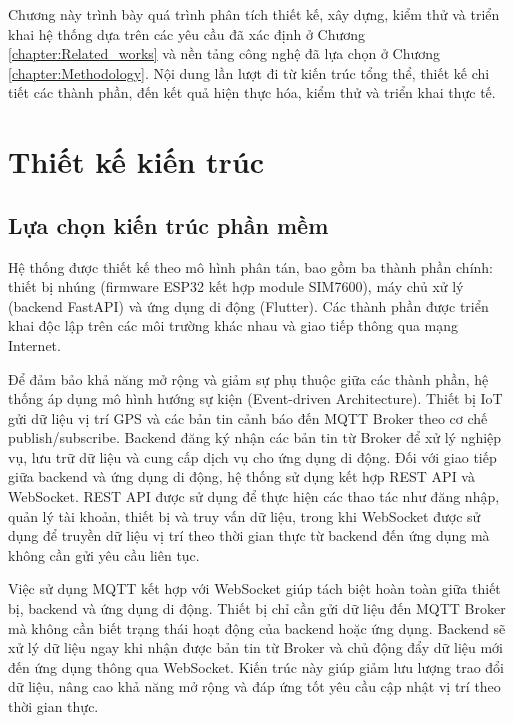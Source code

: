 \documentclass[../DoAn.tex]{subfiles}
\begin{document}
    \providecommand{\hinhcho}[1]{\fbox{\begin{minipage}[c][5.5cm][c]{0.85\textwidth}\centering\textit{[#1]}\end{minipage}}}

    Chương này trình bày quá trình phân tích thiết kế, xây dựng, kiểm thử và triển khai hệ thống dựa trên các yêu cầu đã xác định ở Chương \ref{chapter:Related_works} và nền tảng công nghệ đã lựa chọn ở Chương \ref{chapter:Methodology}. Nội dung lần lượt đi từ kiến trúc tổng thể, thiết kế chi tiết các thành phần, đến kết quả hiện thực hóa, kiểm thử và triển khai thực tế.

    \section{Thiết kế kiến trúc}

    \subsection{Lựa chọn kiến trúc phần mềm}

    Hệ thống được thiết kế theo mô hình phân tán, bao gồm ba thành phần chính: thiết bị nhúng (firmware ESP32 kết hợp module SIM7600), máy chủ xử lý (backend FastAPI) và ứng dụng di động (Flutter). Các thành phần được triển khai độc lập trên các môi trường khác nhau và giao tiếp thông qua mạng Internet.

    Để đảm bảo khả năng mở rộng và giảm sự phụ thuộc giữa các thành phần, hệ thống áp dụng mô hình hướng sự kiện (Event-driven Architecture). Thiết bị IoT gửi dữ liệu vị trí GPS và các bản tin cảnh báo đến MQTT Broker theo cơ chế publish/subscribe. Backend đăng ký nhận các bản tin từ Broker để xử lý nghiệp vụ, lưu trữ dữ liệu và cung cấp dịch vụ cho ứng dụng di động. Đối với giao tiếp giữa backend và ứng dụng di động, hệ thống sử dụng kết hợp REST API và WebSocket. REST API được sử dụng để thực hiện các thao tác như đăng nhập, quản lý tài khoản, thiết bị và truy vấn dữ liệu, trong khi WebSocket được sử dụng để truyền dữ liệu vị trí theo thời gian thực từ backend đến ứng dụng mà không cần gửi yêu cầu liên tục.

    Việc sử dụng MQTT kết hợp với WebSocket giúp tách biệt hoàn toàn giữa thiết bị, backend và ứng dụng di động. Thiết bị chỉ cần gửi dữ liệu đến MQTT Broker mà không cần biết trạng thái hoạt động của backend hoặc ứng dụng. Backend sẽ xử lý dữ liệu ngay khi nhận được bản tin từ Broker và chủ động đẩy dữ liệu mới đến ứng dụng thông qua WebSocket. Kiến trúc này giúp giảm lưu lượng trao đổi dữ liệu, nâng cao khả năng mở rộng và đáp ứng tốt yêu cầu cập nhật vị trí theo thời gian thực.
\end{document}
